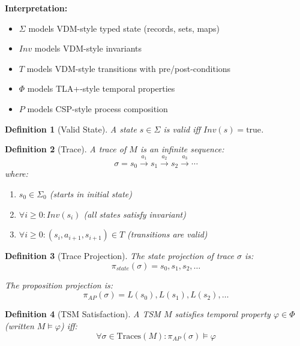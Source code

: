 \documentclass[conference]{IEEEtran}
\newtheorem{definition}{Definition}
\begin{document}
\textbf{Interpretation:}
\begin{itemize}
\item $\Sigma$ models VDM-style typed state (records, sets, maps)
\item $Inv$ models VDM-style invariants
\item $T$ models VDM-style transitions with pre/post-conditions
\item $\Phi$ models TLA+-style temporal properties
\item $P$ models CSP-style process composition
\end{itemize}

\begin{definition}[Valid State]
A state $s \in \Sigma$ is \textit{valid} iff $Inv(s) = \text{true}$.
\end{definition}

\begin{definition}[Trace]
A \textit{trace} of $M$ is an infinite sequence:
\begin{equation}
\sigma = s_0 \xrightarrow{a_1} s_1 \xrightarrow{a_2} s_2 \xrightarrow{a_3} \cdots
\end{equation}
where:
\begin{enumerate}
\item $s_0 \in \Sigma_0$ (starts in initial state)
\item $\forall i \geq 0: Inv(s_i)$ (all states satisfy invariant)
\item $\forall i \geq 0: (s_i, a_{i+1}, s_{i+1}) \in T$ (transitions are valid)
\end{enumerate}
\end{definition}

\begin{definition}[Trace Projection]
The \textit{state projection} of trace $\sigma$ is:
\begin{equation}
\pi_{state}(\sigma) = s_0, s_1, s_2, \ldots
\end{equation}

The \textit{proposition projection} is:
\begin{equation}
\pi_{AP}(\sigma) = L(s_0), L(s_1), L(s_2), \ldots
\end{equation}
\end{definition}

\begin{definition}[TSM Satisfaction]
A TSM $M$ \textit{satisfies} temporal property $\varphi \in \Phi$ (written $M \models \varphi$) iff:
\begin{equation}
\forall \sigma \in \text{Traces}(M): \pi_{AP}(\sigma) \models \varphi
\end{equation}
\end{definition}
\end{document}
